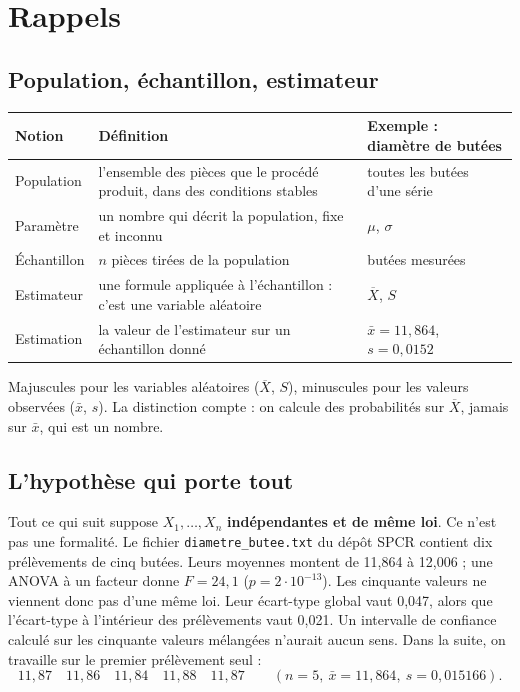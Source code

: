 \documentclass[11pt,a4paper]{article}
\theoremstyle{sj}
\theoremstyle{definition}
\theoremstyle{remark}
\newcommand{\Xb}{\overline{X}}
\begin{document}
\section{Rappels}\label{sec:rappels}

\subsection{Population, échantillon, estimateur}

\begin{center}
\small
\begin{tabular}{l >{\raggedright\arraybackslash}p{5.2cm} >{\raggedright\arraybackslash}p{5.2cm}}
\toprule
Notion & Définition & Exemple : diamètre de butées\\
\midrule
Population & l'ensemble des pièces que le procédé produit, dans des conditions stables & toutes les butées d'une série\\
Paramètre & un nombre qui décrit la population, fixe et inconnu & $\mu$, $\sigma$\\
Échantillon & $n$ pièces tirées de la population & 5 butées mesurées\\
Estimateur & une formule appliquée à l'échantillon : c'est une variable aléatoire & $\Xb$, $S$\\
Estimation & la valeur de l'estimateur sur un échantillon donné & $\bar x=11{,}864$, $s=0{,}0152$\\
\bottomrule
\end{tabular}
\end{center}

Majuscules pour les variables aléatoires ($\Xb$, $S$), minuscules pour les valeurs observées ($\bar x$, $s$). La distinction compte : on calcule des probabilités sur $\Xb$, jamais sur $\bar x$, qui est un nombre.

\subsection{L'hypothèse qui porte tout}

Tout ce qui suit suppose $X_1,\dots,X_n$ \textbf{indépendantes et de même loi}. Ce n'est pas une formalité. Le fichier \texttt{diametre\_butee.txt} du dépôt SPCR contient dix prélèvements de cinq butées. Leurs moyennes montent de 11,864 à 12,006 ; une ANOVA à un facteur donne $F=24{,}1$ ($p=2\cdot10^{-13}$). Les cinquante valeurs ne viennent donc pas d'une même loi. Leur écart-type global vaut 0,047, alors que l'écart-type à l'intérieur des prélèvements vaut 0,021. Un intervalle de confiance calculé sur les cinquante valeurs mélangées n'aurait aucun sens. Dans la suite, on travaille sur le premier prélèvement seul :
\[
11{,}87\quad 11{,}86\quad 11{,}84\quad 11{,}88\quad 11{,}87\qquad(n=5,\ \bar x=11{,}864,\ s=0{,}015166).
\]
\end{document}

